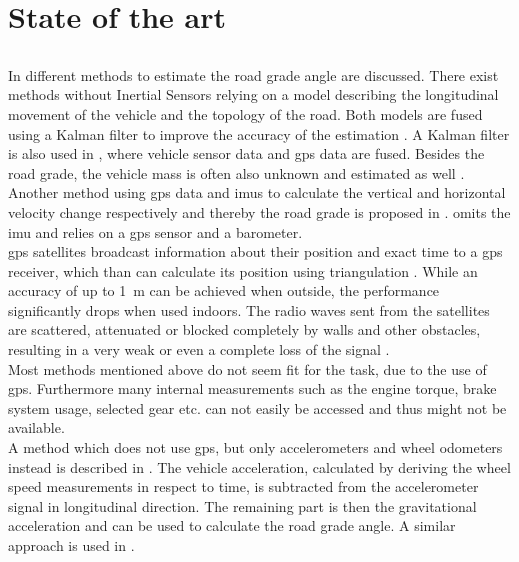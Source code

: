 \chapter{State of the art}
\label{ch:StateOfTheArt}

\section{}
In \cite{Jauch2018} different methods to estimate the road grade angle are discussed.
There exist methods without Inertial Sensors relying on a model describing the longitudinal movement of the vehicle and the topology of the road.
Both models are fused using a Kalman filter to improve the accuracy of the estimation \cite{SAHLHOLM200755}.
A Kalman filter is also used in \cite{Sahlholm2010}, where vehicle sensor data and \gls{gps} data are fused.
Besides the road grade, the vehicle mass is often also unknown and estimated as well \cite{Sahlholm2010,Maleej2015}.
Another method using \gls{gps} data and \gls{imu}s to calculate the vertical and horizontal velocity change respectively and thereby the road grade is proposed in \cite{Ryu2004}.
\cite{YazdaniBoroujeni2014} omits the \gls{imu} and relies on a \gls{gps} sensor and a barometer.\\
\gls{gps} satellites broadcast information about their position and exact time to a \gls{gps} receiver, which than can calculate its position using triangulation \cite{Koyuncu2010}.
While an accuracy of up to \SI{1}{\metre} can be achieved when outside, the performance significantly drops when used indoors.
The radio waves sent from the satellites are scattered, attenuated or blocked completely by walls and other obstacles, resulting in a very weak or even a complete loss of the signal \cite{Ozdenizci2015}.\\
Most methods mentioned above do not seem fit for the task, due to the use of \gls{gps}.
Furthermore many internal measurements such as the engine torque, brake system usage, selected gear etc. can not easily be accessed and thus might not be available.\\
A method which does not use \gls{gps}, but only accelerometers and wheel odometers instead is described in \cite{Nilsson2012}.
The vehicle acceleration, calculated by deriving the wheel speed measurements in respect to time, is subtracted from the accelerometer signal in longitudinal direction.
The remaining part is then the gravitational acceleration and can be used to calculate the road grade angle.
A similar approach is used in \cite{Sentouh2008}.




